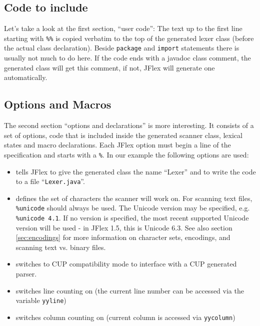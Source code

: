 \documentclass[11pt]{scrartcl}
\newcommand{\ver}{1.5}
\newcommand{\latestunicodever}{6.3}
\begin{document}
\subsection{Code to include\label{ExampleUserCode}}
Let's take a look at the first section, ``user code'': The text up to the
first line starting with \texttt{\%\%} is copied verbatim to the top 
of the generated lexer class (before the actual class declaration). 
Beside \texttt{package} and \texttt{import} statements there is usually not much 
to do here. If the code ends with a javadoc class comment, the generated class
will get this comment, if not, JFlex will generate one automatically.

\subsection{Options and Macros\label{ExampleOptions}}
The second section ``options and declarations'' is more interesting. It consists
of a set of options, code that is included inside the generated scanner
class, lexical states and macro declarations. Each JFlex option must begin
a line of the specification and starts with a \texttt{\%}. In our example
the following options are used:

\begin{itemize}
\item
  \texttt{} tells JFlex to give the
  generated class the name ``Lexer'' and to write the code to a file ``\texttt{Lexer.java}''.

\item
  \texttt{} defines the set of characters the scanner will 
  work on. For scanning text files, \texttt{\%unicode} should always be used.  The Unicode
  version may be specified, e.g. \texttt{\%unicode 4.1}.  If no version is specified, the
  most recent supported Unicode version will be used - in JFlex \ver, this is
  Unicode \latestunicodever. See also section \ref{sec:encodings} for more information
  on character sets, encodings, and scanning text vs. binary files.

\item
  \texttt{} switches to CUP compatibility
  mode to interface with a CUP generated parser.

\item
  \texttt{} switches line counting on (the
  current line number can be accessed via the variable \texttt{yyline})

\item
  \texttt{} switches column counting on
  (current column is accessed via \texttt{yycolumn})

\end{itemize}
\label{ExampleScannerCode}
\end{document}
